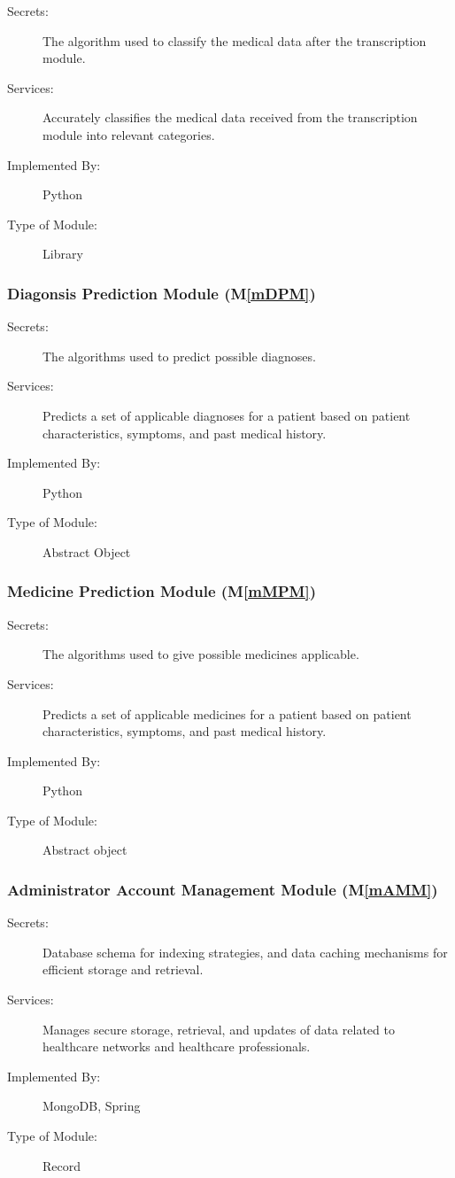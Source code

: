 \documentclass[12pt, titlepage]{article}
\newcommand{\mref}[1]{M\ref{#1}}
\begin{document}
\begin{description}
\item[Secrets:] The algorithm used to classify the medical data after the transcription module.
\item[Services:] Accurately classifies the medical data received from the transcription module into relevant categories.
\item[Implemented By:] Python
\item[Type of Module:] Library
\end{description}

\subsubsection{Diagonsis Prediction Module (\mref{mDPM})}

\begin{description}
\item[Secrets:] The algorithms used to predict possible diagnoses.
\item[Services:] Predicts a set of applicable diagnoses for a patient based on patient characteristics, symptoms, and past medical history.
\item[Implemented By:] Python
\item[Type of Module:] Abstract Object
\end{description}

\subsubsection{Medicine Prediction Module (\mref{mMPM})}

\begin{description}
\item[Secrets:] The algorithms used to give possible medicines applicable.
\item[Services:] Predicts a set of applicable medicines for a patient based on patient characteristics, symptoms, and past medical history.
\item[Implemented By:] Python
\item[Type of Module:] Abstract object
\end{description}

\subsubsection{Administrator Account Management Module (\mref{mAMM})}

\begin{description}
\item[Secrets:]Database schema for indexing strategies, and data caching mechanisms for efficient storage and retrieval.
\item[Services:]Manages secure storage, retrieval, and updates of data related to healthcare networks and healthcare professionals.
\item[Implemented By:]MongoDB, Spring
\item[Type of Module:]Record
\end{description}
\end{document}

